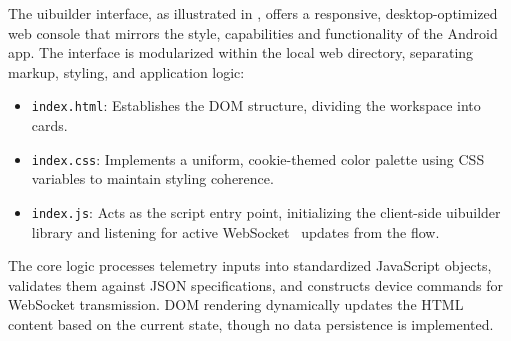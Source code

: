 The uibuilder interface, as illustrated in , offers a responsive, desktop-optimized web console that mirrors the style, capabilities and functionality of the Android app.
The interface is modularized within the local web directory, separating markup, styling, and application logic:

\begin{itemize}
    \item \texttt{index.html}: Establishes the DOM structure, dividing the workspace into cards.
    \item  \texttt{index.css}: Implements a uniform, cookie-themed color palette using CSS variables to maintain styling coherence.
    \item \texttt{index.js}: Acts as the script entry point, initializing the client-side uibuilder library and listening for active WebSocket~\cite{uibuilderv7} updates from the flow.
\end{itemize}

The core logic processes telemetry inputs into standardized JavaScript objects, validates them against JSON specifications, and constructs device commands for WebSocket transmission. DOM rendering dynamically updates the HTML content based on the current state, though no data persistence is implemented.